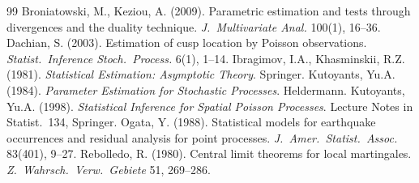 \documentclass[11pt]{article}
\begin{document}
\begin{thebibliography}{99}
 Broniatowski, M., Keziou, A. (2009). Parametric estimation and tests through divergences and the duality technique. \textit{J.\ Multivariate Anal.} 100(1), 16--36.
 Dachian, S. (2003). Estimation of cusp location by Poisson observations. \textit{Statist.\ Inference Stoch.\ Process.} 6(1), 1--14.
 Ibragimov, I.A., Khasminskii, R.Z. (1981). \textit{Statistical Estimation: Asymptotic Theory}. Springer.
 Kutoyants, Yu.A. (1984). \textit{Parameter Estimation for Stochastic Processes}. Heldermann.
 Kutoyants, Yu.A. (1998). \textit{Statistical Inference for Spatial Poisson Processes}. Lecture Notes in Statist.\ 134, Springer.
 Ogata, Y. (1988). Statistical models for earthquake occurrences and residual analysis for point processes. \textit{J.\ Amer.\ Statist.\ Assoc.} 83(401), 9--27.
 Rebolledo, R. (1980). Central limit theorems for local martingales. \textit{Z.\ Wahrsch.\ Verw.\ Gebiete} 51, 269--286.
\end{thebibliography}
\end{document}
